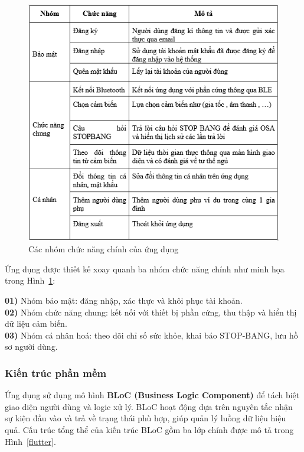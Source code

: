 \begin{figure}[htbp]
    \centering
    \includegraphics[width=\textwidth]{images/app_flow.png}
    \caption{Các nhóm chức năng chính của ứng dụng}
    \label{app_flow}
\end{figure}

Ứng dụng được thiết kế xoay quanh ba nhóm chức năng chính như minh họa 
trong Hình~\ref{app_flow}:

\begin{flushleft}
\textbf{01)} Nhóm bảo mật: đăng nhập, xác thực và khôi phục tài khoản. \\
\textbf{02)} Nhóm chức năng chung: kết nối với thiết bị phần cứng, thu thập và hiển thị dữ liệu cảm biến. \\
\textbf{03)} Nhóm cá nhân hoá: theo dõi chỉ số sức khỏe, khai báo STOP-BANG, lưu hồ sơ người dùng.
\end{flushleft}

\subsubsection*{Kiến trúc phần mềm}
Ứng dụng sử dụng mô hình \textbf{BLoC (Business Logic Component)} để tách biệt giao diện 
người dùng và logic xử lý. BLoC hoạt động dựa trên nguyên tắc nhận sự 
kiện đầu vào và trả về trạng thái phù hợp, giúp quản lý luồng dữ liệu 
hiệu quả. Cấu trúc tổng thể của kiến trúc BLoC gồm ba lớp chính được mô 
tả trong Hình~\ref{flutter}.

